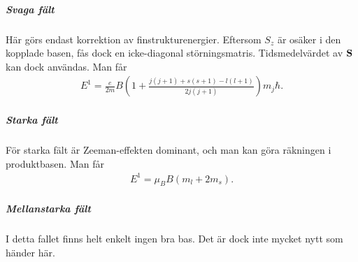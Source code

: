 \subparagraph{Svaga fält}
Här görs endast korrektion av finstrukturenergier. Eftersom $S_{z}$ är osäker i den kopplade basen, fås dock en icke-diagonal störningsmatris. Tidsmedelvärdet av $\vb{S}$ kan dock användas. Man får
\begin{align*}
	E^{1} = \frac{e}{2m}B\left(1 + \frac{j(j + 1) + s(s + 1) - l(l + 1)}{2j(j + 1)}\right)m_{j}\hbar.
\end{align*}

\subparagraph{Starka fält}
För starka fält är Zeeman-effekten dominant, och man kan göra räkningen i produktbasen. Man får
\begin{align*}
	E^{1} = \mu_{B}B(m_{l} + 2m_{s}).
\end{align*}

\subparagraph{Mellanstarka fält}
I detta fallet finns helt enkelt ingen bra bas. Det är dock inte mycket nytt som händer här.